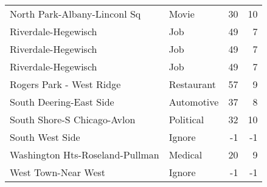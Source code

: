 \begin{tabular}{|l|l|r|r|}
    North Park-Albany-Linconl Sq & Movie & 30    & 10 \\
    Riverdale-Hegewisch & Job   & 49    & 7 \\
    Riverdale-Hegewisch & Job   & 49    & 7 \\
    Riverdale-Hegewisch & Job   & 49    & 7 \\
    Rogers Park - West Ridge & Restaurant & 57    & 9 \\
    South Deering-East Side & Automotive & 37    & 8 \\
    South Shore-S Chicago-Avlon & Political & 32    & 10 \\
    South West Side & Ignore & -1    & -1 \\
    Washington Hts-Roseland-Pullman & Medical & 20    & 9 \\
    West Town-Near West & Ignore & -1    & -1 \\
    \hline
    \end{tabular}%

